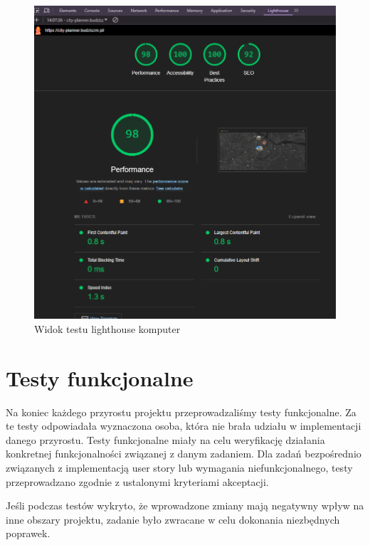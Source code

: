     \begin{figure}[H]
        \centering
        \includegraphics[width=1\textwidth]{attachments/lighthouse}
        \caption{Widok testu lighthouse komputer}
        \label{fig:testy-lighthouse-desktop}
        \end{figure}
\section{Testy funkcjonalne}
\label{sec:testy-funkcjonalne}

Na koniec każdego przyrostu projektu przeprowadzaliśmy testy funkcjonalne. Za te testy odpowiadała wyznaczona osoba, która nie brała udziału w implementacji danego przyrostu. 
Testy funkcjonalne miały na celu weryfikację działania konkretnej funkcjonalności związanej z danym zadaniem. \newline
Dla zadań bezpośrednio związanych z implementacją user story lub wymagania niefunkcjonalnego, testy przeprowadzano zgodnie z ustalonymi kryteriami akceptacji. \newline

Jeśli podczas testów wykryto, że wprowadzone zmiany mają negatywny wpływ na inne obszary projektu, zadanie było zwracane w celu dokonania niezbędnych poprawek.\newline

